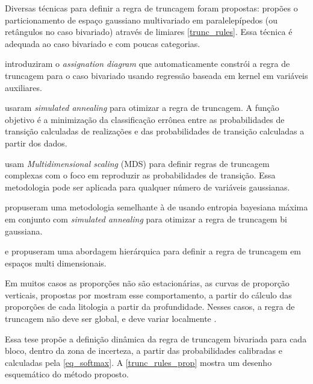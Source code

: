 Diversas técnicas para definir a regra de truncagem foram propostas:  propões o particionamento de espaço gaussiano multivariado em paralelepípedos (ou retângulos no caso bivariado) através de limiares \autoref{trunc_rules}. Essa técnica é adequada ao caso bivariado e com poucas categorias.

 introduziram o \textit{assignation diagram} que automaticamente constrói a regra de truncagem para o caso bivariado usando regressão baseada em kernel em variáveis auxiliares.

 usaram \textit{simulated annealing} para otimizar a regra de truncagem. A função objetivo é a minimização da classificação errônea entre as probabilidades de transição calculadas de realizações e das probabilidades de transição calculadas a partir dos dados.

 usam \textit{Multidimensional scaling} (MDS) para definir regras de truncagem complexas com o foco em reproduzir as probabilidades de transição. Essa metodologia pode ser aplicada para qualquer número de variáveis gaussianas.

 propuseram uma metodologia semelhante à de  usando entropia bayesiana máxima em conjunto com \textit{simulated annealing} para otimizar a regra de truncagem bi gaussiana.

 e  propuseram uma abordagem hierárquica para definir a regra de truncagem em espaços multi dimensionais.

Em muitos casos as proporções não são estacionárias, as curvas de proporção verticais, propostas por  mostram esse comportamento, a partir do cálculo das proporções de cada litologia a partir da profundidade. Nesses casos, a regra de truncagem não deve ser global, e deve variar localmente \cite{sadeghi_optimizing}.

Essa tese propõe a definição dinâmica da regra de truncagem bivariada para cada bloco, dentro da zona de incerteza, a partir das probabilidades calibradas e calculadas pela \autoref{eq_softmax}. A \autoref{trunc_rules_prop} mostra um desenho esquemático do método proposto.

